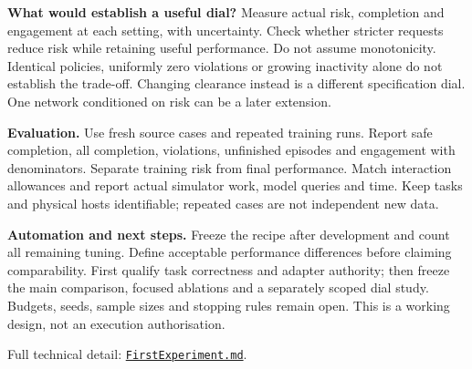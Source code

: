 \documentclass[11pt,a4paper]{article}
\begin{document}
\textbf{What would establish a useful dial?} Measure actual risk, completion and
engagement at each setting, with uncertainty. Check whether stricter requests
reduce risk while retaining useful performance. Do not assume monotonicity.
Identical policies, uniformly zero violations or growing inactivity alone do not
establish the trade-off. Changing clearance instead is a different specification
dial. One network conditioned on risk can be a later extension.

\textbf{Evaluation.} Use fresh source cases and repeated training runs. Report safe
completion, all completion, violations, unfinished episodes and engagement with
denominators. Separate training risk from final performance. Match interaction
allowances and report actual simulator work, model queries and time. Keep tasks
and physical hosts identifiable; repeated cases are not independent new data.

\textbf{Automation and next steps.} Freeze the recipe after development and count
all remaining tuning. Define acceptable performance differences before claiming
comparability. First qualify task correctness and adapter authority; then freeze
the main comparison, focused ablations and a separately scoped dial study.
Budgets, seeds, sample sizes and stopping rules remain open. This is a working
design, not an execution authorisation.

{\small Full technical detail: \href{FirstExperiment.md}{\texttt{FirstExperiment.md}}.}
\end{document}
